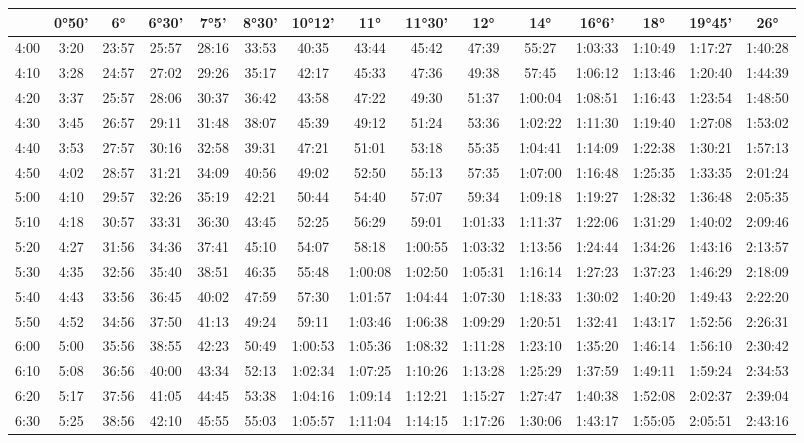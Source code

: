 \begin{scriptsize}\begin{tabular}{c | c | c | c | c | c | c | c | c | c | c | c | c | c | c}
		\space&0°50'&6°&6°30'&7°5'&8°30'&10°12'&11°&11°30'&12°&14°&16°6'&18°&19°45'&26°\\\hline
		4:00&3:20&23:57&25:57&28:16&33:53&40:35&43:44&45:42&47:39&55:27&1:03:33&1:10:49&1:17:27&1:40:28\\\hline
		4:10&3:28&24:57&27:02&29:26&35:17&42:17&45:33&47:36&49:38&57:45&1:06:12&1:13:46&1:20:40&1:44:39\\\hline
		4:20&3:37&25:57&28:06&30:37&36:42&43:58&47:22&49:30&51:37&1:00:04&1:08:51&1:16:43&1:23:54&1:48:50\\\hline
		4:30&3:45&26:57&29:11&31:48&38:07&45:39&49:12&51:24&53:36&1:02:22&1:11:30&1:19:40&1:27:08&1:53:02\\\hline
		4:40&3:53&27:57&30:16&32:58&39:31&47:21&51:01&53:18&55:35&1:04:41&1:14:09&1:22:38&1:30:21&1:57:13\\\hline
		4:50&4:02&28:57&31:21&34:09&40:56&49:02&52:50&55:13&57:35&1:07:00&1:16:48&1:25:35&1:33:35&2:01:24\\\hline
		5:00&4:10&29:57&32:26&35:19&42:21&50:44&54:40&57:07&59:34&1:09:18&1:19:27&1:28:32&1:36:48&2:05:35\\\hline
		5:10&4:18&30:57&33:31&36:30&43:45&52:25&56:29&59:01&1:01:33&1:11:37&1:22:06&1:31:29&1:40:02&2:09:46\\\hline
		5:20&4:27&31:56&34:36&37:41&45:10&54:07&58:18&1:00:55&1:03:32&1:13:56&1:24:44&1:34:26&1:43:16&2:13:57\\\hline
		5:30&4:35&32:56&35:40&38:51&46:35&55:48&1:00:08&1:02:50&1:05:31&1:16:14&1:27:23&1:37:23&1:46:29&2:18:09\\\hline
		5:40&4:43&33:56&36:45&40:02&47:59&57:30&1:01:57&1:04:44&1:07:30&1:18:33&1:30:02&1:40:20&1:49:43&2:22:20\\\hline
		5:50&4:52&34:56&37:50&41:13&49:24&59:11&1:03:46&1:06:38&1:09:29&1:20:51&1:32:41&1:43:17&1:52:56&2:26:31\\\hline
		6:00&5:00&35:56&38:55&42:23&50:49&1:00:53&1:05:36&1:08:32&1:11:28&1:23:10&1:35:20&1:46:14&1:56:10&2:30:42\\\hline
		6:10&5:08&36:56&40:00&43:34&52:13&1:02:34&1:07:25&1:10:26&1:13:28&1:25:29&1:37:59&1:49:11&1:59:24&2:34:53\\\hline
		6:20&5:17&37:56&41:05&44:45&53:38&1:04:16&1:09:14&1:12:21&1:15:27&1:27:47&1:40:38&1:52:08&2:02:37&2:39:04\\\hline
		6:30&5:25&38:56&42:10&45:55&55:03&1:05:57&1:11:04&1:14:15&1:17:26&1:30:06&1:43:17&1:55:05&2:05:51&2:43:16\\\hline

\end{tabular}
\end{scriptsize}
